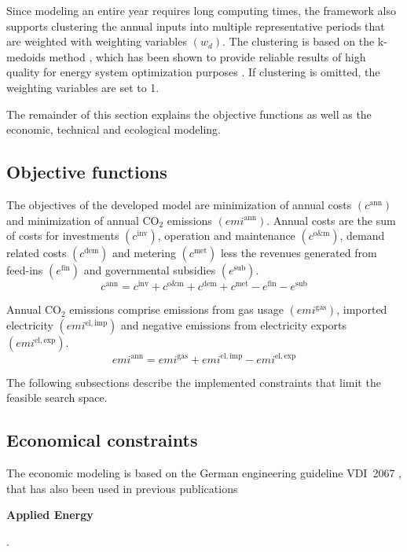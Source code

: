 Since modeling an entire year requires long computing times, the framework also supports clustering the annual inputs into multiple representative periods that are weighted with weighting variables $\left(w_d\right)$.
The clustering is based on the k-medoids method \cite{Vinod1969,Dominguez-Munoz2011}, which has been shown to provide reliable results of high quality for energy system optimization purposes \cite{Schutz2016}.
If clustering is omitted, the weighting variables are set to 1.

The remainder of this section explains the objective functions as well as the economic, technical and ecological modeling.

\subsection{Objective functions}
The objectives of the developed model are minimization of annual costs $\left(c^\mathrm{ann}\right)$ and minimization of annual CO$_2$ emissions $\left(emi^\mathrm{ann}\right)$.
Annual costs are the sum of costs for investments $\left(c^\mathrm{inv}\right)$, operation and maintenance $\left(c^\mathrm{o\&m}\right)$, demand related costs $\left(c^\mathrm{dem}\right)$ and metering $\left(c^\mathrm{met}\right)$ less the revenues generated from feed-ins $\left(e^\mathrm{fin}\right)$ and governmental subsidies $\left(e^\mathrm{sub}\right)$.
\begin{equation}
	c^\mathrm{ann} = c^\mathrm{inv} + c^\mathrm{o\&m} + c^\mathrm{dem} + c^\mathrm{met} - e^\mathrm{fin} - e^\mathrm{sub}
	\label{eqn:obj_costs}
\end{equation}

Annual CO$_2$ emissions comprise emissions from gas usage $\left(emi^\mathrm{gas}\right)$, imported electricity $\left(emi^\mathrm{el,imp}\right)$ and negative emissions from electricity exports $\left(emi^\mathrm{el,exp}\right)$.
\begin{equation}
	emi^\mathrm{ann} = emi^\mathrm{gas} + emi^\mathrm{el,imp} - emi^\mathrm{el,exp}
\end{equation}

The following subsections describe the implemented constraints that limit the feasible search space.

\subsection{Economical constraints}
The economic modeling is based on the German engineering guideline VDI~2067 \cite{VDI_2067}, that has also been used in previous publications \cite{Harb2016,Schutz2016,Schutz2016a} \begin{LARGE}
\textbf{Applied Energy}
\end{LARGE}.

